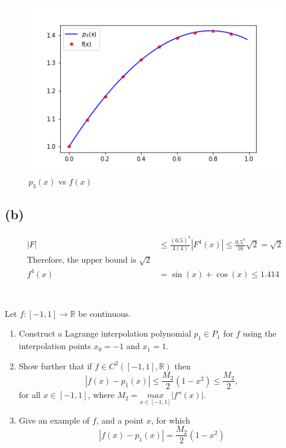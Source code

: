 \documentclass{article}
\begin{document}
\begin{figure}[H]
    \centering
    \includegraphics[width = .8 \linewidth]{images/hw05q01b.png}
    \caption{$p_3(x)$ vs $f(x)$}
    \label{fig:my_label}
\end{figure}

\subsection*{(b)}

\begin{align*}
    |F| &\le \frac{(0.5)^4}{4(4)}|F^4(x)| \le \frac{0.5^4}{16}\sqrt{2} = \sqrt{2}\\
    \text{Therefore, the upper bound is $\sqrt{2}$}\\
    f^4(x) &= \sin(x) + \cos(x) \le 1.414\\
\end{align*}


\section{}
Let $f: [-1,1] \to \mathbb{R}$ be continuous.
\begin{enumerate}[label = (\alph*)]
    \item Construct a Lagrange interpolation polynomial $p_1 \in P_1$ for $f$ using the interpolation points $x_0 = -1$ and $x_1 = 1$.
    \item Show further that if $f \in C^2([-1,1], \mathbb{R})$ then $$|f(x)-p_1(x)| \le \frac{M_2}{2}(1-x^2) \le \frac{M_2}{2},$$
    for all $x \in [-1,1]$, where $M_2 = \underset{x \in [-1,1]}{max} |f''(x)|$.
    \item Give an example of $f$, and a point $x$, for which
    $$|f(x)-p_1(x)|= \frac{M_2}{2}(1-x^2)$$
\end{enumerate}
\vspace{10mm}
\end{document}
